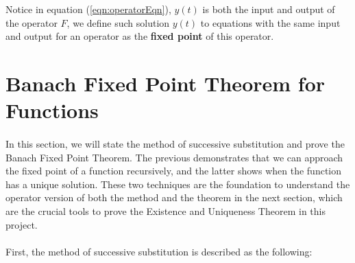 \documentclass{article}
\theoremstyle{definition}
\theoremstyle{remark}
\theoremstyle{example}
\begin{document}
Notice in equation (\ref{eqn:operatorEqn}), $y(t)$ is both the input and output of the operator $F$, we define such solution $y(t)$ to equations with the same input and output for an operator as the \textbf{fixed point} of this operator.

\section{Banach Fixed Point Theorem for Functions}

\paragraph{  }

In this section, we will state the method of successive substitution and prove the Banach Fixed Point Theorem. The previous demonstrates that we can approach the fixed point of a function recursively, and the latter shows when the function has a unique solution. These two techniques are the foundation to understand the operator version of both the method and the theorem in the next section, which are the crucial tools to prove the Existence and Uniqueness Theorem in this project. 

\paragraph{  }

First, the method of successive substitution is described as the following:
\end{document}

